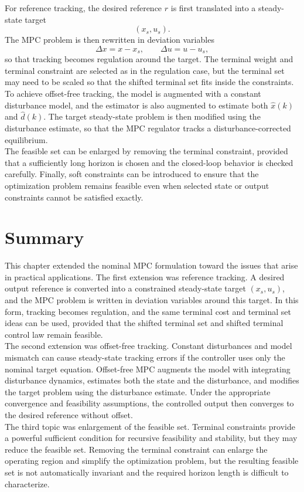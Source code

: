 For reference tracking, the desired reference \(r\) is first translated into a steady-state target
\[
    (x_s,u_s).
\]
The MPC problem is then rewritten in deviation variables
\[
    \Delta x=x-x_s,\qquad \Delta u=u-u_s,
\]
so that tracking becomes regulation around the target. The terminal weight and terminal
constraint are selected as in the regulation case, but the terminal set may need to be scaled so
that the shifted terminal set fits inside the constraints.\\
To achieve offset-free tracking, the model is augmented with a constant disturbance model, and
the estimator is also augmented to estimate both \(\hat x(k)\) and \(\hat d(k)\). The target
steady-state problem is then modified using the disturbance estimate, so that the MPC regulator
tracks a disturbance-corrected equilibrium.\\
The feasible set can be enlarged by removing the terminal constraint, provided that a sufficiently
long horizon is chosen and the closed-loop behavior is checked carefully. Finally, soft constraints
can be introduced to ensure that the optimization problem remains feasible even when selected
state or output constraints cannot be satisfied exactly.
\section{Summary}

This chapter extended the nominal MPC formulation toward the issues that arise in practical
applications. The first extension was reference tracking. A desired output reference is converted
into a constrained steady-state target \((x_s,u_s)\), and the MPC problem is written in deviation
variables around this target. In this form, tracking becomes regulation, and the same terminal
cost and terminal set ideas can be used, provided that the shifted terminal set and shifted terminal
control law remain feasible.\\

The second extension was offset-free tracking. Constant disturbances and model mismatch can
cause steady-state tracking errors if the controller uses only the nominal target equation.
Offset-free MPC augments the model with integrating disturbance dynamics, estimates both the
state and the disturbance, and modifies the target problem using the disturbance estimate. Under
the appropriate convergence and feasibility assumptions, the controlled output then converges to
the desired reference without offset.\\
The third topic was enlargement of the feasible set. Terminal constraints provide a powerful
sufficient condition for recursive feasibility and stability, but they may reduce the feasible set.
Removing the terminal constraint can enlarge the operating region and simplify the optimization
problem, but the resulting feasible set is not automatically invariant and the required horizon
length is difficult to characterize.\\

